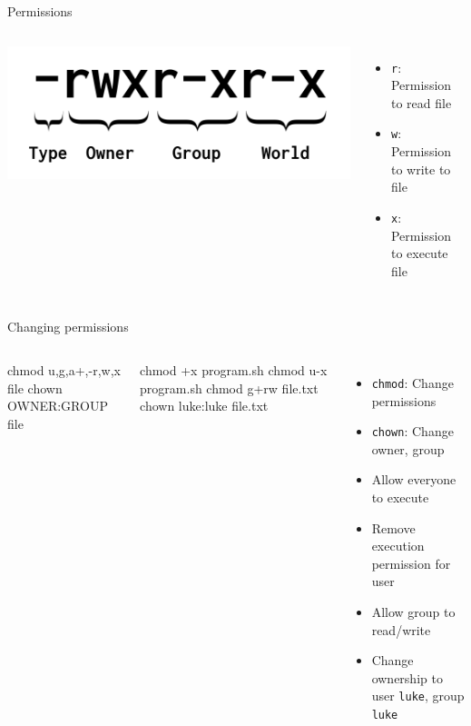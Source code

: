     \begin{frame}[t,fragile]{Permissions}
        \begin{columns}[T]
            \includegraphics[width=1.0\columnwidth]{img/permissions_example.png}
            \begin{itemize}
                \item \texttt{r}: Permission to read file
                \item \texttt{w}: Permission to write to file
                \item \texttt{x}: Permission to execute file
            \end{itemize}
        \end{columns}
    \end{frame}

    \begin{frame}[t,fragile]{Changing permissions}
        \begin{columns}[T]
            \begin{bashenv}[\small]
chmod {u,g,a}{+,-}{r,w,x} file
chown OWNER:GROUP file
            \end{bashenv}
            \vspace{0.65cm}
            \begin{bashenv}[\small]
chmod +x program.sh
chmod u-x program.sh
chmod g+rw file.txt
chown luke:luke file.txt
            \end{bashenv}
            \begin{itemize}
                \item \texttt{chmod}: Change permissions
                \item \texttt{chown}: Change owner, group
                \vspace{0.8cm}
                \item Allow everyone to execute
                \item Remove execution permission for user
                \item Allow group to read/write
                \item Change ownership to user \texttt{luke}, group \texttt{luke}
            \end{itemize}
        \end{columns}
    \end{frame}

